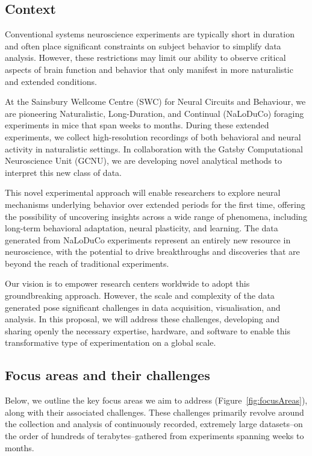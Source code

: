 \subsection{Context}

Conventional systems neuroscience experiments are typically short in duration
and often place significant constraints on subject behavior to simplify data
analysis.
%
However, these restrictions may limit our ability to observe critical
aspects of brain function and behavior that only manifest in more naturalistic
and extended conditions.

At the Sainsbury Wellcome Centre (SWC) for Neural Circuits and Behaviour, we
are pioneering Naturalistic, Long-Duration, and Continual (NaLoDuCo) foraging
experiments in mice that span weeks to months. During these extended
experiments, we collect high-resolution recordings of both behavioral and
neural activity in naturalistic settings.
%
In collaboration with the Gatsby Computational Neuroscience Unit (GCNU), we are
developing novel analytical methods to interpret this new class of data.

This novel experimental approach will enable researchers to explore neural
mechanisms underlying behavior over extended periods for the first time,
offering the possibility of uncovering insights across a wide range of
phenomena, including long-term behavioral adaptation, neural plasticity, and
learning.
%
The data generated from NaLoDuCo experiments represent an entirely
new resource in neuroscience, with the potential to drive breakthroughs and
discoveries that are beyond the reach of traditional experiments.

Our vision is to empower research centers worldwide to adopt this
groundbreaking approach.
%
However, the scale and complexity of the data generated pose significant
challenges in data acquisition, visualisation, and analysis.
%
In this proposal, we will address these challenges, developing and sharing
openly the necessary expertise, hardware, and software to enable this
transformative type of experimentation on a global scale.

\subsection{Focus areas and their challenges}

Below, we outline the key focus areas we aim to address
(Figure~\ref{fig:focusAreas}), along with their associated challenges.
%
These challenges primarily revolve around the collection and analysis of
continuously recorded, extremely large datasets--on the order of hundreds of
terabytes--gathered from experiments spanning weeks to months.

